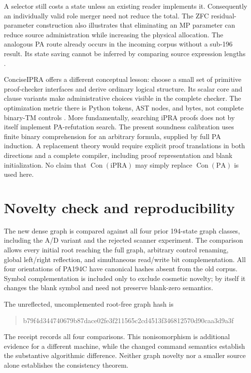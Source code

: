 \documentclass[11pt]{article}
\newcommand{\PA}{\mathrm{PA}}
\newcommand{\Con}{\operatorname{Con}}
\theoremstyle{definition}
\theoremstyle{remark}
\begin{document}
A selector still costs a state unless an existing reader implements it.
Consequently an individually valid role merger need not reduce the total.
The ZFC residual-parameter construction also illustrates that eliminating
an MP parameter can reduce source administration while increasing the
physical allocation. The analogous PA route already occurs in the incoming
corpus without a sub-196 result. Its state saving cannot be inferred by
comparing source expression lengths \cite{residual}.

ConciseIPRA offers a different conceptual lesson: choose a small set of
primitive proof-checker interfaces and derive ordinary logical structure.
Its scalar core and clause variants make administrative choices visible
in the complete checker. The optimization metric there is Python tokens,
AST nodes, and bytes, not complete binary-TM controls \cite{ipra}.
More fundamentally, searching iPRA proofs does not by itself implement
PA-refutation search. The present soundness calibration uses finite binary
comprehension for an arbitrary formula, supplied by full PA induction.
A replacement theory would require explicit proof translations in both
directions and a complete compiler, including proof representation and
blank initialization. No claim that $\Con(\mathrm{iPRA})$ may simply replace
$\Con(\PA)$ is used here.

\section{Novelty check and reproducibility}

The new dense graph is compared against all four prior 194-state graph
classes, including the A/D variant and the rejected scanner experiment.
The comparison allows every initial root reaching the full graph,
arbitrary control renaming, global left/right reflection, and simultaneous
read/write bit complementation. All four orientations of PA194C have
canonical hashes absent from the old corpus. Symbol complementation is
included only to exclude cosmetic novelty; by itself it changes the blank
symbol and need not preserve blank-zero semantics.

The unreflected, uncomplemented root-free graph hash is
\begin{quote}\small\ttfamily
 b79f4d344740679b87dace02fe3f211565c2cd4513f346812570d90caa3d9a3f
\end{quote}
The receipt records all four comparisons. This nonisomorphism is additional
evidence for a different machine, while the changed command semantics
establish the substantive algorithmic difference. Neither graph novelty
nor a smaller source alone establishes the consistency theorem.
\end{document}
